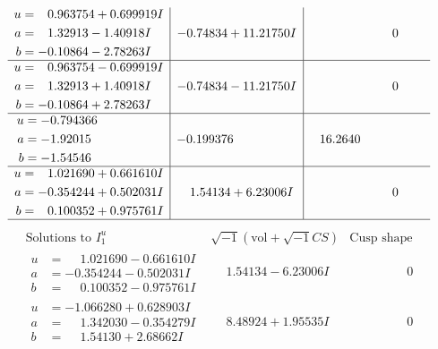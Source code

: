 \documentclass[1p]{elsarticle_modified}
\theoremstyle{definition}
\newcommand{\I}{\sqrt{-1}}
\begin{document}
$$\begin{array}{c|c|c}
\begin{aligned}
u &= \phantom{-}0.963754 + 0.699919 I \\
a &= \phantom{-}1.32913 - 1.40918 I \\
b &= -0.10864 - 2.78263 I\end{aligned}
 & -0.74834 + 11.21750 I & \phantom{-0.000000 } 0 \\ \hline\begin{aligned}
u &= \phantom{-}0.963754 - 0.699919 I \\
a &= \phantom{-}1.32913 + 1.40918 I \\
b &= -0.10864 + 2.78263 I\end{aligned}
 & -0.74834 - 11.21750 I & \phantom{-0.000000 } 0 \\ \hline\begin{aligned}
u &= -0.794366\phantom{ +0.000000I} \\
a &= -1.92015\phantom{ +0.000000I} \\
b &= -1.54546\phantom{ +0.000000I}\end{aligned}
 & -0.199376\phantom{ +0.000000I} & \phantom{-}16.2640\phantom{ +0.000000I} \\ \hline\begin{aligned}
u &= \phantom{-}1.021690 + 0.661610 I \\
a &= -0.354244 + 0.502031 I \\
b &= \phantom{-}0.100352 + 0.975761 I\end{aligned}
 & \phantom{-}1.54134 + 6.23006 I & \phantom{-0.000000 } 0\\
 \hline 
 \end{array}$$\newpage$$\begin{array}{c|c|c}  
\text{Solutions to }I^u_{1}& \I (\text{vol} + \sqrt{-1}CS) & \text{Cusp shape}\\
 \hline 
\begin{aligned}
u &= \phantom{-}1.021690 - 0.661610 I \\
a &= -0.354244 - 0.502031 I \\
b &= \phantom{-}0.100352 - 0.975761 I\end{aligned}
 & \phantom{-}1.54134 - 6.23006 I & \phantom{-0.000000 } 0 \\ \hline\begin{aligned}
u &= -1.066280 + 0.628903 I \\
a &= \phantom{-}1.342030 - 0.354279 I \\
b &= \phantom{-}1.54130 + 2.68662 I\end{aligned}
 & \phantom{-}8.48924 + 1.95535 I & \phantom{-0.000000 } 0 \\ \hline\begin{aligned}

\end{aligned}
\end{array}$$
\end{document}
